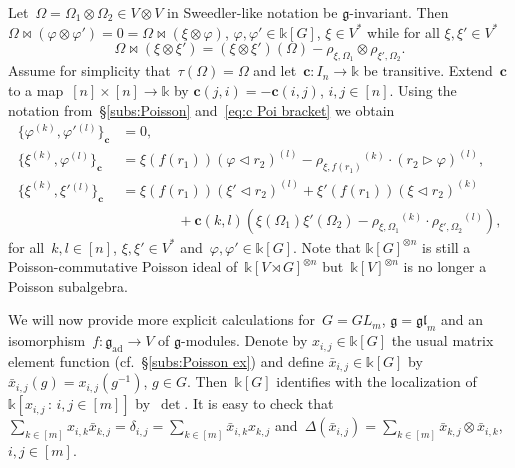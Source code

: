 \documentclass[12pt, reqno]{amsart}
\theoremstyle{definition}
\numberwithin{equation}{section}
\newcommand{\tensor}{\otimes}
\newcommand{\kk}{\mathbb{k}}\newcommand{\lie}[1]{{\mathfrak{#1}}}
\DeclareMathOperator{\ad}{ad}
\begin{document}
Let~$\Omega=\Omega_1\tensor\Omega_2\in V\tensor V$ in Sweedler-like notation be 
$\lie g$-invariant. 
Then $\Omega\bowtie (\varphi\tensor\varphi')=0=
\Omega\bowtie (\xi\tensor\varphi)$,
$\varphi,\varphi'\in\kk[G]$, $\xi\in V^*$ while 
for all $\xi,\xi'\in V^*$ 
$$
\Omega\bowtie(\xi\tensor \xi')=(\xi\tensor \xi')(\Omega)-\rho_{\xi,\Omega_1}\tensor \rho_{\xi',\Omega_2}.
$$
Assume for simplicity that~$\tau(\Omega)=\Omega$ and let~$\mathbf c:I_n\to \kk$ be transitive. Extend~$\mathbf c$
to a map~$[n]\times[n]\to \kk$ by $\mathbf c(j,i)=-\mathbf c(i,j)$, $i,j\in[n]$.
Using the notation from~\S\ref{subs:Poisson} and~\eqref{eq:c Poi bracket} we obtain
\begin{align*}
\{ \varphi^{(k)},\varphi'{}^{(l)}\}_{\mathbf c}&=0,\\
\{ \xi^{(k)},\varphi^{(l)}\}_{\mathbf c}&=\xi(f(r_1))(\varphi\triangleleft r_2)^{(l)}-
\rho_{\xi,f(r_1)}{}^{(k)}\cdot(r_2\triangleright \varphi)^{(l)},\\
\{\xi^{(k)},\xi'{}^{(l)}\}_{\mathbf c}&=\xi(f(r_1))(\xi'\triangleleft r_2)^{(l)}+\xi'(f(r_1))(\xi\triangleleft r_2)^{(k)}\\
&\qquad\qquad+\mathbf c(k,l)
(\xi(\Omega_1)
\xi'(\Omega_2)-\rho_{\xi,\Omega_1}{}^{(k)}\cdot \rho_{\xi',\Omega_2}{}^{(l)}),
\end{align*}
for all~$k,l\in[n]$, $\xi,\xi'\in V^*$ and~$\varphi,\varphi'\in \kk[G]$. Note that $\kk[G]^{\tensor n}$
is still a Poisson-commutative Poisson ideal of~$\kk[V\rtimes G]^{\tensor n}$
but~$\kk[V]^{\tensor n}$ is no longer a Poisson subalgebra.

We will now provide more explicit calculations for~$G=GL_m$, $\lie g=\lie{gl}_m$ and an isomorphism~$f:\lie g_{\ad}\to V$ of $\lie g$-modules. Denote
by $x_{i,j}\in\kk[G]$ the usual matrix element function (cf.~\S\ref{subs:Poisson ex}) and define
$\bar x_{i,j}\in\kk[G]$ by $\bar x_{i,j}(g)=x_{i,j}(g^{-1})$, $g\in G$. Then~$\kk[G]$ identifies with the localization of~$\kk[x_{i,j}\,:\, i,j\in[m]]$
by~$\det$.
It is easy to check that 
$\sum_{k\in[m]} x_{i,k}\bar x_{k,j}=\delta_{i,j}=\sum_{k\in[m]}\bar x_{i,k}x_{k,j}$ and~$\Delta(\bar x_{i,j})=
\sum_{k\in[m]} \bar x_{k,j}\tensor \bar x_{i,k}$, $i,j\in[m]$. 
\end{document}
